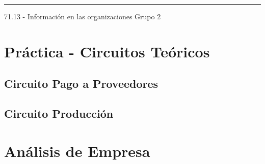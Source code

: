 \documentclass[12pt,titlepage]{report}
\begin{document}
\begin{titlepage}
\vfill

\hrule
\vspace{0.2cm}

\noindent\small{71.13 - Información en las organizaciones \hfill Grupo 2}

\end{titlepage}



\setcounter{page}{1}

\tableofcontents
\newpage




\part{Práctica - Circuitos Te\'oricos}

\chapter{Circuito Pago a Proveedores}


\chapter{Circuito Producci\'on}


\part{Análisis de Empresa}
\end{document}
